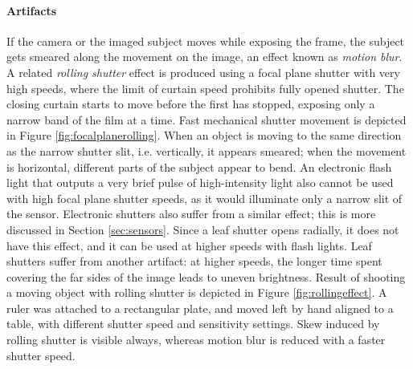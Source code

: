 \paragraph{Artifacts}
If the camera or the imaged subject moves while exposing the frame, the subject gets smeared along the movement on the image, an effect known as \emph{motion blur}.
A related \emph{rolling shutter} effect is produced using a focal plane shutter with very high speeds, where the limit of curtain speed prohibits fully opened shutter.
The closing curtain starts to move before the first has stopped, exposing only a narrow band of the film at a time.
Fast mechanical shutter movement is depicted in Figure \ref{fig:focalplanerolling}.
When an object is moving to the same direction as the narrow shutter slit, i.e. vertically, it appears smeared;
when the movement is horizontal, different parts of the subject appear to bend.
An electronic flash light that outputs a very brief pulse of high-intensity light also cannot be used with high focal plane shutter speeds, as it would illuminate only a narrow slit of the sensor.
Electronic shutters also suffer from a similar effect; this is more discussed in Section \ref{sec:sensors}.
Since a leaf shutter opens radially, it does not have this effect, and it can be used at higher speeds with flash lights.
Leaf shutters suffer from another artifact:
at higher speeds, the longer time spent covering the far sides of the image leads to uneven brightness.
Result of shooting a moving object with rolling shutter is depicted in Figure \ref{fig:rollingeffect}.
A ruler was attached to a rectangular plate, and moved left by hand aligned to a table, with different shutter speed and sensitivity settings.
Skew induced by rolling shutter is visible always, whereas motion blur is reduced with a faster shutter speed.


